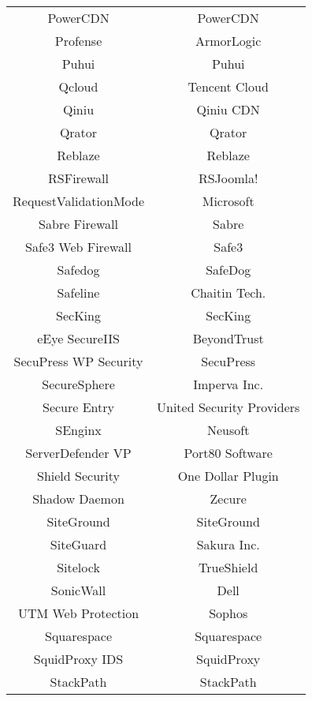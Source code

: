 \begin{table}[h]
\begin{tabular}{|c | c |}
  PowerCDN                        & PowerCDN\\
  Profense                        & ArmorLogic\\
  Puhui                           & Puhui\\
  Qcloud                          & Tencent Cloud\\
  Qiniu                           & Qiniu CDN\\
  Qrator                          & Qrator\\
  Reblaze                         & Reblaze\\
  RSFirewall                      & RSJoomla!\\
  RequestValidationMode           & Microsoft\\
  Sabre Firewall                  & Sabre\\
  Safe3 Web Firewall              & Safe3\\
  Safedog                         & SafeDog\\
  Safeline                        & Chaitin Tech.\\
  SecKing                         & SecKing\\
  eEye SecureIIS                  & BeyondTrust\\
  SecuPress WP Security           & SecuPress\\
  SecureSphere                    & Imperva Inc.\\
  Secure Entry                    & United Security Providers\\
  SEnginx                         & Neusoft\\
  ServerDefender VP               & Port80 Software\\
  Shield Security                 & One Dollar Plugin\\
  Shadow Daemon                   & Zecure\\
  SiteGround                      & SiteGround\\
  SiteGuard                       & Sakura Inc.\\
  Sitelock                        & TrueShield\\
  SonicWall                       & Dell\\
  UTM Web Protection              & Sophos\\
  Squarespace                     & Squarespace\\
  SquidProxy IDS                  & SquidProxy\\
  StackPath                       & StackPath\\

\end{tabular}
\end{table}
